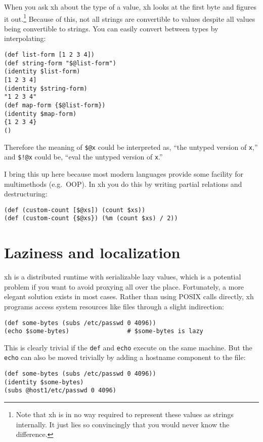 \documentclass{report}
\begin{document}
    When you ask xh about the type of a value, xh looks at the first byte and
    figures it out.\footnote{Note that xh is in no way required to represent
    these values as strings internally. It just lies so convincingly that you
    would never know the difference.} Because of this, not all strings are
    convertible to values despite all values being convertible to strings. You
    can easily convert between types by interpolating:

\begin{verbatim}
(def list-form [1 2 3 4])
(def string-form "$@list-form")
(identity $list-form)
[1 2 3 4]
(identity $string-form)
"1 2 3 4"
(def map-form {$@list-form})
(identity $map-form)
{1 2 3 4}
()
\end{verbatim}

    Therefore the meaning of \verb|$@x| could be interpreted as, ``the untyped
    version of {\tt x},'' and \verb|$!@x| could be, ``eval the untyped version
    of {\tt x}.''

    I bring this up here because most modern languages provide some facility
    for multimethods (e.g.~OOP). In xh you do this by writing partial relations
    and destructuring:

\begin{verbatim}
(def (custom-count [$@xs]) (count $xs))
(def (custom-count {$@xs}) (%m (count $xs) / 2))
\end{verbatim}

\section{Laziness and localization}\label{sec:laziness-and-localization}
    xh is a distributed runtime with serializable lazy values, which is a
    potential problem if you want to avoid proxying all over the place.
    Fortunately, a more elegant solution exists in most cases. Rather than
    using POSIX calls directly, xh programs access system resources like files
    through a slight indirection:

\begin{verbatim}
(def some-bytes (subs /etc/passwd 0 4096))
(echo $some-bytes)                # $some-bytes is lazy
\end{verbatim}

    This is clearly trivial if the {\tt def} and {\tt echo} execute on the same
    machine. But the {\tt echo} can also be moved trivially by adding a
    hostname component to the file:

\begin{verbatim}
(def some-bytes (subs /etc/passwd 0 4096))
(identity $some-bytes)
(subs @host1/etc/passwd 0 4096)
\end{verbatim}
\end{document}
